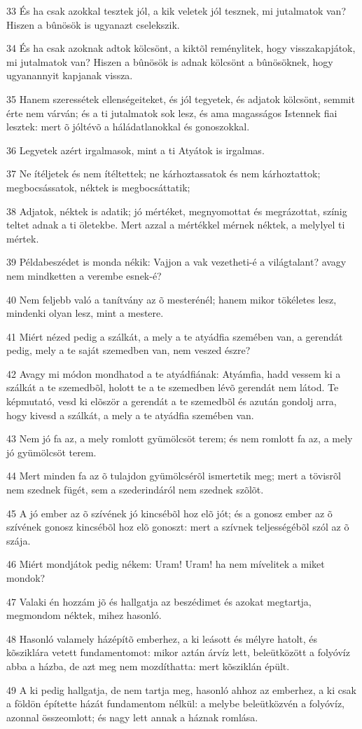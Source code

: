 \par 33 És ha csak azokkal tesztek jól, a kik veletek jól tesznek, mi jutalmatok van? Hiszen a bûnösök is ugyanazt cselekszik.
\par 34 És ha csak azoknak adtok kölcsönt, a kiktõl reménylitek, hogy visszakapjátok, mi jutalmatok van? Hiszen a bûnösök is adnak kölcsönt a bûnösöknek, hogy ugyanannyit kapjanak vissza.
\par 35 Hanem szeressétek ellenségeiteket, és jól tegyetek, és adjatok kölcsönt, semmit érte nem várván; és a ti jutalmatok sok lesz, és ama magasságos Istennek fiai lesztek: mert õ jóltévõ a háládatlanokkal és gonoszokkal.
\par 36 Legyetek azért irgalmasok, mint a ti Atyátok is irgalmas.
\par 37 Ne ítéljetek és nem ítéltettek; ne kárhoztassatok és nem kárhoztattok; megbocsássatok, néktek is megbocsáttatik;
\par 38 Adjatok, néktek is adatik; jó mértéket, megnyomottat és megrázottat, színig teltet adnak a ti öletekbe. Mert azzal a mértékkel mérnek néktek, a melylyel ti mértek.
\par 39 Példabeszédet is monda nékik: Vajjon a vak vezetheti-é a világtalant? avagy nem mindketten a verembe esnek-é?
\par 40 Nem feljebb való a tanítvány az õ mesterénél; hanem mikor tökéletes lesz, mindenki olyan lesz, mint a mestere.
\par 41 Miért nézed pedig a szálkát, a mely a te atyádfia szemében van, a gerendát pedig, mely a te saját szemedben van, nem veszed észre?
\par 42 Avagy mi módon mondhatod a te atyádfiának: Atyámfia, hadd vessem ki a szálkát a te szemedbõl, holott te a te szemedben lévõ gerendát nem látod. Te képmutató, vesd ki elõször a gerendát a te szemedbõl és azután gondolj arra, hogy kivesd a szálkát, a mely a te atyádfia szemében van.
\par 43 Nem jó fa az, a mely romlott gyümölcsöt terem; és nem romlott fa az, a mely jó gyümölcsöt terem.
\par 44 Mert minden fa az õ tulajdon gyümölcsérõl ismertetik meg; mert a tövisrõl nem szednek fügét, sem a szederindáról nem szednek szõlõt.
\par 45 A jó ember az õ szívének jó kincsébõl hoz elõ jót; és a gonosz ember az õ szívének gonosz kincsébõl hoz elõ gonoszt: mert a szívnek teljességébõl szól az õ szája.
\par 46 Miért mondjátok pedig nékem: Uram! Uram! ha nem mívelitek a miket mondok?
\par 47 Valaki én hozzám jõ és hallgatja az beszédimet és azokat megtartja, megmondom néktek, mihez hasonló.
\par 48 Hasonló valamely házépítõ emberhez, a ki leásott és mélyre hatolt, és kõsziklára vetett fundamentomot: mikor aztán árvíz lett, beleütközött a folyóvíz abba a házba, de azt meg nem mozdíthatta: mert kõsziklán épült.
\par 49 A ki pedig hallgatja, de nem tartja meg, hasonló ahhoz az emberhez, a ki csak a földön építette házát fundamentom nélkül: a melybe beleütközvén a folyóvíz, azonnal összeomlott; és nagy lett annak a háznak romlása.

